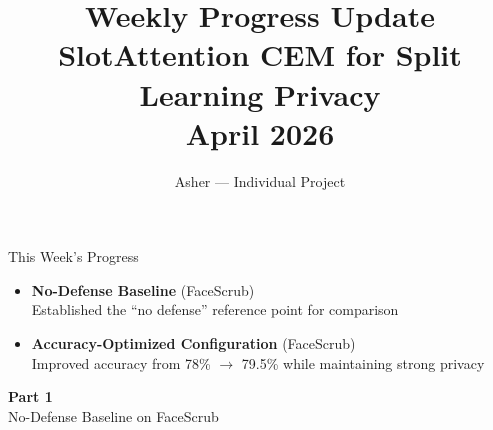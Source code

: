 \documentclass[aspectratio=169, 10pt]{beamer}
\title[Weekly Update]{\textbf{Weekly Progress Update}\\[0.2cm]
{\normalsize SlotAttention CEM for Split Learning Privacy}\\[0.1cm]
{\small April 2026}}
\author{Asher --- Individual Project}
\date{}
\begin{document}
\begin{frame}
\titlepage
\end{frame}

\begin{frame}{This Week's Progress}

\begin{itemize}\setlength{\itemsep}{12pt}
    \item[\textbf{1.}] \textbf{No-Defense Baseline} (FaceScrub)\\
    {\small Established the ``no defense'' reference point for comparison}

    \vspace{4pt}

    \item[\textbf{2.}] \textbf{Accuracy-Optimized Configuration} (FaceScrub)\\
    {\small Improved accuracy from 78\% $\to$ 79.5\% while maintaining strong privacy}
\end{itemize}

\end{frame}

\begin{frame}{}
\vfill
\begin{center}
{\Huge\textbf{Part 1}}\\[0.3cm]
{\Large No-Defense Baseline on FaceScrub}
\end{center}
\vfill
\end{frame}
\end{document}
